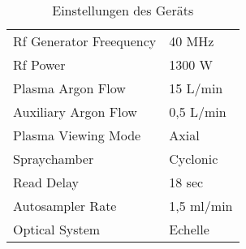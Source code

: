 \begin{table}[htbp]
  \centering
  \caption{Einstellungen des Geräts}
    \begin{tabular}{ll}
    \toprule
    Rf Generator Freequency & 40 MHz \\
    Rf Power & 1300 W \\
    Plasma Argon Flow & 15 L/min \\
    Auxiliary Argon Flow & 0,5 L/min \\
    Plasma Viewing Mode & Axial \\
    Spraychamber & Cyclonic \\
    Read Delay & 18 sec \\
    Autosampler Rate & 1,5 ml/min \\
    Optical System & Echelle \\
    \bottomrule 
    \end{tabular}%
  \label{tab:conditions}%
\end{table}%

